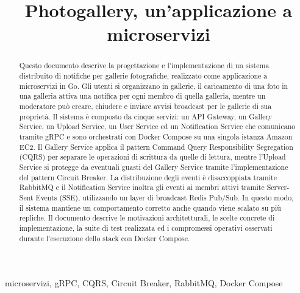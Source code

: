 \documentclass[conference]{IEEEtran}
\begin{document}
\title{Photogallery, un'applicazione a microservizi}

\author{
}

\maketitle

\begin{abstract}
Questo documento descrive la progettazione e l'implementazione di un sistema distribuito di notifiche per gallerie fotografiche, realizzato come applicazione a microservizi in Go. Gli utenti si organizzano in gallerie, il caricamento di una foto in una galleria attiva una notifica per ogni membro di quella galleria, mentre un moderatore può creare, chiudere e inviare avvisi broadcast per le gallerie di sua proprietà. Il sistema è composto da cinque servizi: un API Gateway, un Gallery Service, un Upload Service, un User Service ed un Notification Service che comunicano tramite gRPC e sono orchestrati con Docker Compose su una singola istanza Amazon EC2. Il Gallery Service applica il pattern Command Query Responsibility Segregation (CQRS) per separare le operazioni di scrittura da quelle di lettura, mentre l'Upload Service si protegge da eventuali guasti del Gallery Service tramite l'implementazione del pattern Circuit Breaker. La distribuzione degli eventi è disaccoppiata tramite RabbitMQ e il Notification Service inoltra gli eventi ai membri attivi tramite Server-Sent Events (SSE), utilizzando un layer di broadcast Redis Pub/Sub. In questo modo, il sistema mantiene un comportamento corretto anche quando viene scalato su più repliche. Il documento descrive le motivazioni architetturali, le scelte concrete di implementazione, la suite di test realizzata ed i compromessi operativi osservati durante l'esecuzione dello stack con Docker Compose.
\end{abstract}
\begin{IEEEkeywords}
microservizi, gRPC, CQRS, Circuit Breaker, RabbitMQ, Docker Compose
\end{IEEEkeywords}
\end{document}
